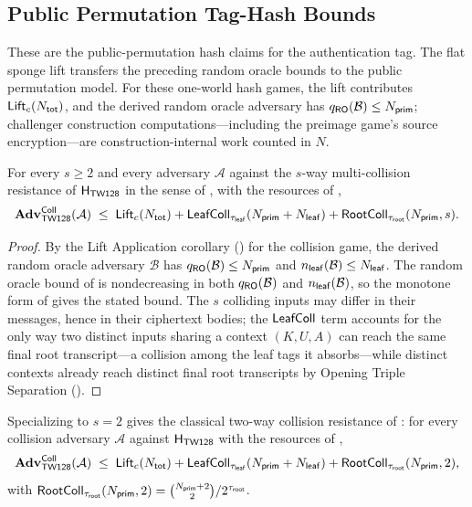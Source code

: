 \subsection{Public Permutation Tag-Hash Bounds}
\label{sec:root-tag-pp}

These are the public-permutation hash claims for the authentication tag. The
flat sponge lift transfers the preceding random oracle bounds to the public
permutation model. For these one-world hash games, the lift contributes
$\mathsf{Lift}_c(N_{\mathsf{tot}})$, and the derived random oracle adversary has
$q_{\mathsf{RO}}(\mathcal{B}) \leq N_{\mathsf{prim}}$; challenger construction
computations---including the preimage game's source encryption---are
construction-internal work counted in $N$.

\begin{theorem}
\label{thm:coll}
For every $s \geq 2$ and every adversary $\mathcal{A}$ against the $s$-way
multi-collision resistance of $\mathsf{H}_{\mathsf{TW128}}$ in the sense of \cite{BH22}, with the
resources of ,
\[
  \mathbf{Adv}^{\mathsf{Coll}}_{\textsf{TW128}}(\mathcal{A})
  \;\leq\;
  \mathsf{Lift}_c(N_{\mathsf{tot}})
  + \mathsf{LeafColl}_{\tau_{\mathsf{leaf}}}(N_{\mathsf{prim}}+N_{\mathsf{leaf}})
  + \mathsf{RootColl}_{\tau_{\mathsf{root}}}(N_{\mathsf{prim}}, s).
\]
\end{theorem}

\begin{proof}
By the Lift Application corollary () for the
collision game, the derived random oracle adversary $\mathcal{B}$ has
$q_{\mathsf{RO}}(\mathcal{B}) \leq N_{\mathsf{prim}}$ and $n_{\mathsf{leaf}}(\mathcal{B}) \leq N_{\mathsf{leaf}}$. The
random oracle bound of  is nondecreasing in both
$q_{\mathsf{RO}}(\mathcal{B})$ and $n_{\mathsf{leaf}}(\mathcal{B})$, so the monotone form of
 gives the stated bound. The $s$ colliding
inputs may differ in their messages, hence in their ciphertext bodies; the
$\mathsf{LeafColl}$ term accounts for the only way two distinct inputs sharing a
context $(K, U, A)$ can reach the same final root transcript---a collision
among the leaf tags it absorbs---while distinct contexts already reach
distinct final root transcripts by Opening Triple Separation
().
\end{proof}

\begin{corollary}
\label{cor:coll-rs04}
Specializing  to $s = 2$ gives the classical two-way
collision resistance of \cite{RS04}: for every collision adversary
$\mathcal{A}$ against $\mathsf{H}_{\mathsf{TW128}}$ with the resources of ,
\[
  \mathbf{Adv}^{\mathsf{Coll}}_{\textsf{TW128}}(\mathcal{A})
  \;\leq\;
  \mathsf{Lift}_c(N_{\mathsf{tot}})
  + \mathsf{LeafColl}_{\tau_{\mathsf{leaf}}}(N_{\mathsf{prim}}+N_{\mathsf{leaf}})
  + \mathsf{RootColl}_{\tau_{\mathsf{root}}}(N_{\mathsf{prim}}, 2),
\]
with $\mathsf{RootColl}_{\tau_{\mathsf{root}}}(N_{\mathsf{prim}}, 2) = \binom{N_{\mathsf{prim}} + 2}{2} / 2^{\tau_{\mathsf{root}}}$.
\end{corollary}

